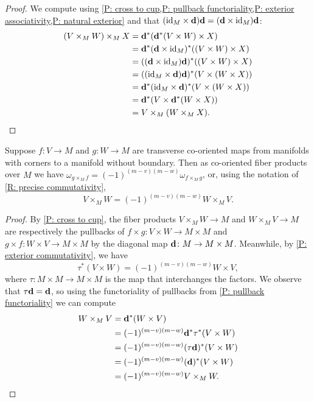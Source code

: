 \begin{proof}
	We compute using \cref{P: cross to cup,P: pullback functoriality,P: exterior associativity,P: natural exterior} and that $(\mathrm{id}_M \times \mathbf{d})\mathbf{d} = (\mathbf{d} \times \mathrm{id}_M)\mathbf{d}$:
	\begin{align*}
		(V \times_M W) \times_M X& = \mathbf{d}^*(\mathbf{d}^*(V \times W) \times X)\\
		& = \mathbf{d}^*(\mathbf{d} \times \mathrm{id}_M)^*((V \times W) \times X)\\
		& = ((\mathbf{d} \times \mathrm{id}_M)\mathbf{d})^*((V \times W) \times X)\\
		& = ((\mathrm{id}_M \times \mathbf{d})\mathbf{d})^*(V \times (W \times X))\\
		& = \mathbf{d}^*(\mathrm{id}_M \times \mathbf{d})^*(V \times (W \times X))\\
		& = \mathbf{d}^*(V \times \mathbf{d}^*(W \times X))\\
		& = V \times_M (W \times_M X).\qedhere
	\end{align*}
\end{proof}

\begin{proposition}\label{P: graded comm}
	Suppose $f \colon V \to M$ and $g \colon W \to M$ are transverse co-oriented maps from manifolds with corners to a manifold without boundary.
	Then as co-oriented fiber products over $M$ we have $\omega_{g \times_M f} = (-1)^{(m-v)(m-w)} \omega_{f \times_M g}$, or, using the notation of \cref{R: precise commutativity},
	$$V \times_M W = (-1)^{(m-v)(m-w)} W \times_M V.$$
\end{proposition}

\begin{proof}
	By \cref{P: cross to cup}, the fiber products $V \times_M W \to M$ and $W \times_M V \to M$ are respectively the pullbacks of $f \times g \colon V \times W \to M \times M$ and $g \times f \colon W \times V \to M \times M$ by the diagonal map $\mathbf{d} \colon M \to M \times M$.
	Meanwhile, by \cref{P: exterior commutativity}, we have
	$$\tau^*(V \times W) = (-1)^{(m-v)(m-w)}W \times V,$$
	where $\tau \colon M \times M \to M \times M$ is the map that interchanges the factors.
	We observe that $\tau \mathbf{d} = \mathbf{d}$, so using the functoriality of pullbacks from \cref{P: pullback functoriality} we can compute
	\begin{align*}
		W \times_M V &= \mathbf{d}^*(W \times V)\\
		&= (-1)^{(m-v)(m-w)} \mathbf{d}^* \tau^*(V \times W)\\
		&= (-1)^{(m-v)(m-w)}(\tau \mathbf{d})^*(V \times W)\\
		&= (-1)^{(m-v)(m-w)}(\mathbf{d})^*(V \times W)\\
		&= (-1)^{(m-v)(m-w)} V \times_M W.\qedhere
	\end{align*}
\end{proof}

